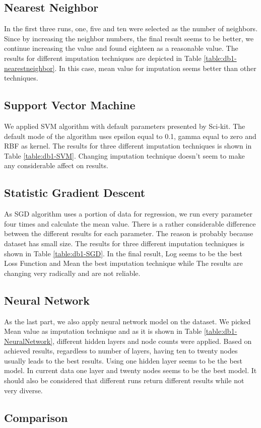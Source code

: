 \subsection{Nearest Neighbor}
In the first three runs, one, five and ten were selected as the number of neighbors. Since by increasing the neighbor numbers, the final result seems to be better, we continue increasing the value and found eighteen as a reasonable value. The results for different imputation techniques are depicted in Table \ref{table:db1-nearestneighbor}. In this case, mean value for imputation seems better than other techniques.

\subsection{Support Vector Machine}
We applied SVM algorithm with default parameters presented by Sci-kit. The default mode of the algorithm uses epsilon equal to 0.1, gamma equal to zero and RBF as kernel. The results for three different imputation techniques is shown in Table \ref{table:db1-SVM}. Changing imputation technique doesn't seem to make any considerable affect on results.

\subsection{Statistic Gradient Descent}
As SGD algorithm uses a portion of data for regression, we run every parameter four times and calculate the mean value. There is a rather considerable difference between the different results for each parameter. The reason is probably because dataset has small size. The results for three different imputation techniques is shown in Table \ref{table:db1-SGD}. In the final result, Log seems to be the best Loss Function and Mean the best imputation technique while The results are changing very radically and are not reliable.

\subsection{Neural Network}
As the last part, we also apply neural network model on the dataset. We picked Mean value as imputation technique and as it is shown in Table \ref{table:db1-NeuralNetwork}, different hidden layers and node counts were applied. Based on achieved results, regardless to number of layers, having ten to twenty nodes usually leads to the best results. Using one hidden layer seems to be the best model. In current data one layer and twenty nodes seems to be the best model. It should also be considered that different runs return different results while not very diverse.

\subsection{Comparison}
